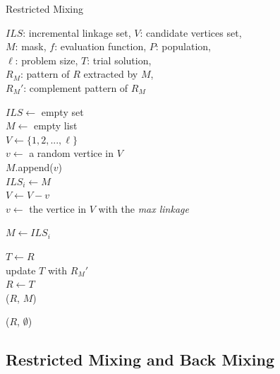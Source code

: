 \begin{algorithm}[t!]
\caption{Restricted Mixing}\label{algo_disjdecomp}

$ILS$: incremental linkage set, $V$: candidate vertices set, \\
$M$: mask, $f$: evaluation function, $P$: population, \\
$\ell$: problem size, $T$: trial solution, \\
${R_M}$: pattern of $R$ extracted by $M$, \\
${R_M}'$: complement pattern of ${R_M}$

\BlankLine
{}

\BlankLine
$ILS \leftarrow$ empty set \\
$M \leftarrow$ empty list \\
$V \leftarrow \{ 1, 2, ..., \ell \}$ \\
$v \leftarrow$ a random vertice in $V$ \\


\BlankLine
{}
 {
    $M$.append($v$) \\
    $ILS_{i} \leftarrow M$ \\
    $V \leftarrow V - v$ \\

    $v \leftarrow$ the vertice in $V$ with the {\it max linkage}\\
}

\BlankLine
{}
 {

    $M \leftarrow ILS_{i}$ \\

     {

        $T \leftarrow R$ \\
        update $T$ with ${R_M}'$ \\

         {
            $R \leftarrow T$ \\
            \Return ($R$, $M$)
        }
    }
}
\Return ($R$, $\emptyset$) 
\end{algorithm}


\subsection{Restricted Mixing and Back Mixing}

